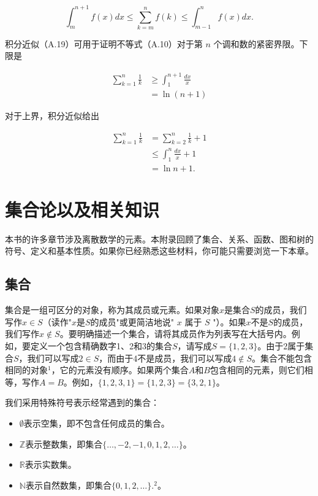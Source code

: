 \documentclass[lang=cn,newtx,10pt,scheme=chinese]{elegantbook}
\begin{document}
$$
\int_m^{n+1} f(x) d x \leq \sum_{k=m}^n f(k) \leq \int_{m-1}^n f(x) d x .
$$

积分近似（A.19）可用于证明不等式（A.10）对于第 $n$ 个调和数的紧密界限。下限是

$$
\begin{aligned}
\sum_{k=1}^n \frac{1}{k} & \geq \int_1^{n+1} \frac{d x}{x} \\
& =\ln (n+1)
\end{aligned}
$$

对于上界，积分近似给出

$$
\begin{aligned}
\sum_{k=1}^n \frac{1}{k} & =\sum_{k=2}^n \frac{1}{k}+1 \\
& \leq \int_1^n \frac{d x}{x}+1 \\
& =\ln n+1 .
\end{aligned}
$$

\chapter{集合论以及相关知识}

本书的许多章节涉及离散数学的元素。本附录回顾了集合、关系、函数、图和树的符号、定义和基本性质。如果你已经熟悉这些材料，你可能只需要浏览一下本章。

\section{集合}

集合是一组可区分的对象，称为其成员或元素。如果对象$x$是集合$S$的成员，我们写作$x \in S$（读作"$x$是$S$的成员"或更简洁地说" $x$ 属于 $S$ "）。如果$x$不是$S$的成员，我们写作$x \notin S$。要明确描述一个集合，请将其成员作为列表写在大括号内。例如，要定义一个包含精确数字1、2和3的集合$S$，请写成$S=\{1,2,3\}$。由于2属于集合$S$，我们可以写成$2 \in S$，而由于4不是成员，我们可以写成$4 \notin S$。集合不能包含相同的对象${ }^1$，它的元素没有顺序。如果两个集合$A$和$B$包含相同的元素，则它们相等，写作$A=B$。例如，$\{1,2,3,1\}=\{1,2,3\}=\{3,2,1\}$。

我们采用特殊符号表示经常遇到的集合：

\begin{itemize}
\item $\emptyset$表示空集，即不包含任何成员的集合。
\item $\mathbb{Z}$表示整数集，即集合$\{\ldots,-2,-1,0,1,2,\ldots\}$。
\item $\mathbb{R}$表示实数集。
\item $\mathbb{N}$表示自然数集，即集合$\{0,1,2,\ldots\} .^2$。
\end{itemize}
\end{document}
